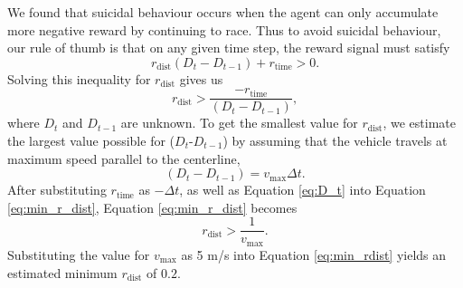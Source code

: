 
We found that suicidal behaviour occurs when the agent can only accumulate more negative reward by continuing to race.
Thus to avoid suicidal behaviour, our rule of thumb is that on any given time step, the reward signal must satisfy
\begin{equation}
    r_{\text{dist}}(D_{t} - D_{t-1}) + r_{\text{time}} > 0.
\end{equation}
Solving this inequality for $r_{\text{dist}}$ gives us
\begin{equation}
    r_{\text{dist}} > \frac{-r_{\text{time}}}{(D_t-D_{t-1})},
\label{eq:min_r_dist}
\end{equation}
where $D_{t}$ and $D_{t-1}$ are unknown.
To get the smallest value for $r_{\text{dist}}$, we estimate the largest value possible for ($D_{t}$-$D_{t-1}$) by assuming that the vehicle  travels at maximum speed parallel to the centerline,
\begin{equation}\label{eq:D_t}
    (D_t - D_{t-1}) = v_{\text{max}} \Delta t.
\end{equation}
After substituting $r_{\text{time}}$ as $-\Delta t$, as well as Equation \ref{eq:D_t} into Equation \ref{eq:min_r_dist}, Equation \ref{eq:min_r_dist} becomes
\begin{equation}\label{eq:min_rdist}
    r_{\text{dist}} > \frac{1}{v_{\text{max}}}.
\end{equation}
Substituting the value for $v_{\text{max}}$ as 5 m/s into Equation \ref{eq:min_rdist} yields an estimated minimum $r_{\text{dist}}$ of $0.2$.

